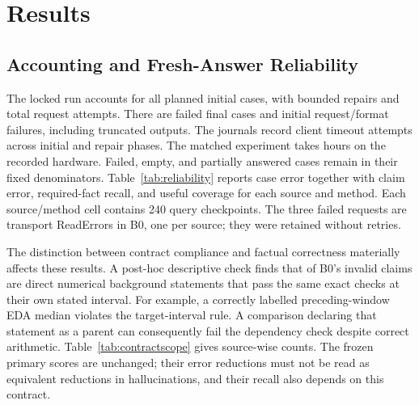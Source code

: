 \section{Results}
\label{sec:results}

\subsection{Accounting and Fresh-Answer Reliability}

The locked run accounts for all \TotalInitial{} planned initial cases, with
\TotalRepairs{} bounded repairs and \TotalRequests{} total request attempts.
There are \TotalFailed{} failed final cases and \TotalInitialErrors{} initial
request/format failures, including \TotalTruncated{} truncated outputs. The
journals record \ClientTimeouts{} client timeout attempts across initial and
repair phases. The matched experiment takes \MainHours{} hours on the
recorded hardware. Failed, empty, and partially answered cases remain in their
fixed denominators. Table~\ref{tab:reliability} reports case error together with
claim error, required-fact recall, and useful coverage for each source and method.
Each source/method cell contains 240 query checkpoints. The three failed requests
are transport ReadErrors in B0, one per source; they were retained without retries.

\begin{table}[t]
\caption{Fresh displayed answers by source. All rates are percentages. Recall
counts answerable required slots; coverage requires all such slots. An empty
answer contributes no checkable claims and reduces coverage. Errors are violations
of the bounded query contract, including interval scope.}
\label{tab:reliability}
\centering\small\setlength{\tabcolsep}{3.2pt}

\end{table}



The distinction between contract compliance and factual correctness materially
affects these results. A post-hoc descriptive check finds that
\OffTargetSupportedClaims{} of B0's \BaselineInvalidClaims{} invalid claims are
direct numerical background statements that pass the same exact checks at their
own stated interval. For example, a correctly labelled preceding-window EDA
median violates the target-interval rule. A comparison declaring that statement
as a parent can consequently fail the dependency check despite correct arithmetic.
Table~\ref{tab:contractscope} gives source-wise counts. The frozen primary scores
are unchanged; their error reductions must not be read as equivalent reductions
in hallucinations, and their recall also depends on this contract.

